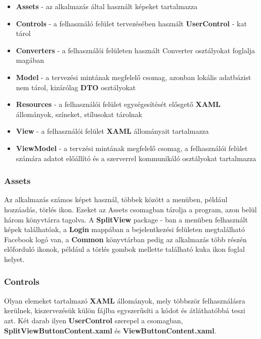 \documentclass[a4paper,12pt]{report}
\begin{document}
    \begin{itemize}
        \item \textbf{Assets} - az alkalmazás által használt képeket tartalmazza
        \item \textbf{Controls} - a felhasználó felület tervezésében használt \textbf{UserControl} - kat tárol
        \item \textbf{Converters} - a felhasználói felületen használt Converter osztályokat foglalja magában
        \item \textbf{Model} - a tervezési mintának megfelelő csomag, azonban lokális adatbázist nem tárol, kizárólag \textbf{DTO} osztályokat
        \item \textbf{Resources} - a felhasználói felület egységesítését elősgető \textbf{XAML} állományok, színeket, stílusokat tárolnak
        \item \textbf{View} - a felhasználói felület \textbf{XAML} állományait tartalmazza
        \item \textbf{ViewModel} - a tervzési mintának megfelelő csomag, a felhasználói felület számára adatot előállító és a szerverrel
        kommunikáló osztályokat tartalmazza
    \end{itemize}

    \subsubsection{Assets}
    Az alkalmazás számos képet használ, többek között a menüben, például hozzáadás, törlés ikon. Ezeket az Assets csomagban tárolja a program,
    azon belül három könyvtárra tagolva. A \textbf{SplitView} package - ban a menüben felhasznált képek találhatóak, a \textbf{Login} mappában
    a bejelentkezési felületen megtalálható Facebook logó van, a \textbf{Common} könyvtárban pedig az alkalmazás több részén előforduló ikonok,
    például a törlés gombok mellette található kuka ikon foglal helyet.

    \subsubsection{Controls}
    Olyan elemeket tartalmazó \textbf{XAML} állományok, mely többször felhasználásra kerülnek, kiszervezésük külön fájlba egyszerűsíti a kódot
    és átláthatóbbá teszi azt. Két darab ilyen \textbf{UserControl} szerepel a csomagban, \textbf{SplitViewButtonContent.xaml} és
    \textbf{ViewButtonContent.xaml}.\\
\end{document}
